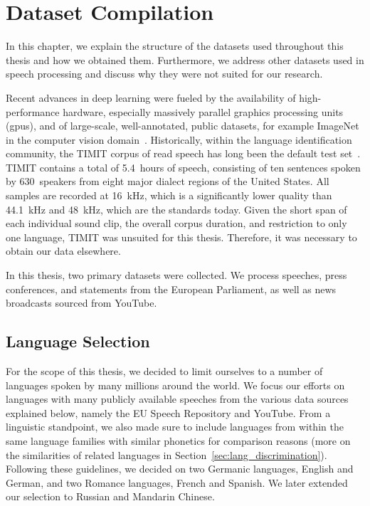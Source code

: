 \section{Dataset Compilation}
\label{sec:datasets}
	In this chapter, we explain the structure of the datasets used throughout this thesis and how we obtained them.
	Furthermore, we address other datasets used in speech processing and discuss why they were not suited for our research.

	Recent advances in deep learning were fueled by the availability of high-performance hardware, especially massively parallel graphics processing units (\ac{gpu}s), and of large-scale, well-annotated, public datasets, for example ImageNet in the computer vision domain~\cite{ILSVRC15}. Historically, within the language identification community, the TIMIT corpus of read speech has long been the default test set~\cite{garofolo1993darpa}. TIMIT contains a total of \num{5.4}~hours of speech, consisting of ten sentences spoken by \num{630}~speakers from eight major dialect regions of the United States. All samples are recorded at \SI{16}{\kilo\hertz}, which is a significantly lower quality than \SI{44.1}{\kilo\hertz} and \SI{48}{\kilo\hertz}, which are the standards today. Given the short span of each individual sound clip, the overall corpus duration, and restriction to only one language, TIMIT was unsuited for this thesis. Therefore, it was necessary to obtain our data elsewhere.

  	In this thesis, two primary datasets were collected. We process speeches, press conferences, and statements from the European Parliament, as well as news broadcasts sourced from YouTube.

\subsection{Language Selection}
For the scope of this thesis, we decided to limit ourselves to a number of languages spoken by many millions around the world. We focus our efforts on languages with many publicly available speeches from the various data sources explained below, namely the EU Speech Repository and YouTube. From a linguistic standpoint, we also made sure to include languages from within the same language families with similar phonetics for comparison reasons (more on the similarities of related languages in Section~\ref{sec:lang_discrimination}). Following these guidelines, we decided on two Germanic languages, English and German, and two Romance languages, French and Spanish. We later extended our selection to Russian and Mandarin Chinese.

